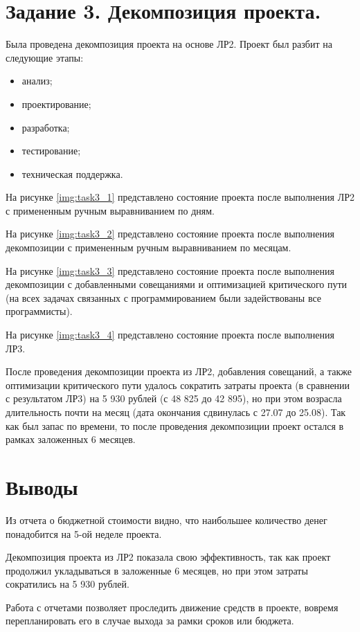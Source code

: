 \documentclass{bmstu}
\begin{document}
\section*{Задание 3. Декомпозиция проекта.}

Была проведена декомпозиция проекта на основе ЛР2. Проект был разбит на следующие этапы:

\begin{itemize}
    \item анализ;
    \item проектирование;
    \item разработка;
    \item тестирование;
    \item техническая поддержка.
\end{itemize}

\clearpage

На рисунке \ref{img:task3_1} представлено состояние проекта после выполнения ЛР2 с примененным ручным выравниванием по дням.


На рисунке \ref{img:task3_2} представлено состояние проекта после выполнения декомпозиции с примененным ручным выравниванием по месяцам.


\clearpage

На рисунке \ref{img:task3_3} представлено состояние проекта после выполнения декомпозиции с добавленными совещаниями и оптимизацией критического пути (на всех задачах связанных с программированием были задействованы все программисты).


На рисунке \ref{img:task3_4} представлено состояние проекта после выполнения ЛР3.


\clearpage

После проведения декомпозиции проекта из ЛР2, добавления совещаний, а также оптимизации критического пути удалось сократить затраты проекта (в сравнении с результатом ЛР3) на 5 930 рублей (с 48 825 до 42 895), но при этом возрасла длительность почти на месяц (дата окончания сдвинулась с 27.07 до 25.08). Так как был запас по времени, то после проведения декомпозиции проект остался в рамках заложенных 6 месяцев.

\section*{Выводы}

Из отчета о бюджетной стоимости видно, что наибольшее количество денег понадобится на 5-ой неделе проекта.

Декомпозиция проекта из ЛР2 показала свою эффективность, так как проект продолжил укладываться в заложенные 6 месяцев, но при этом затраты сократились на 5 930 рублей. 

Работа с отчетами позволяет проследить движение средств в проекте, вовремя перепланировать его в случае выхода за рамки сроков или бюджета.
\end{document}
